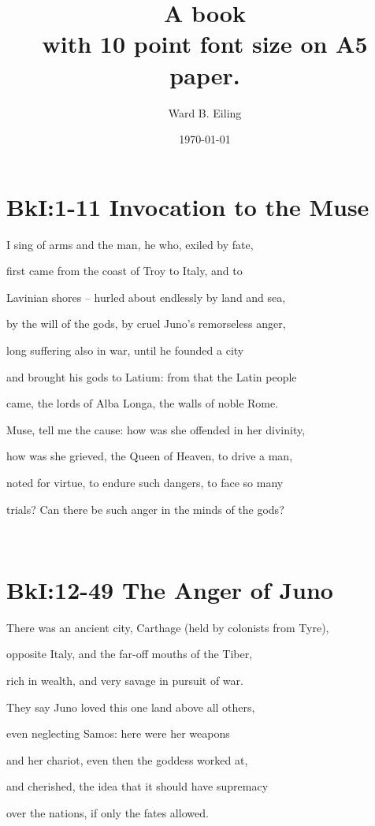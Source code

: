 \documentclass[10pt, a5paper, titlepage]{book}
\title{A book \\ \small with 10 point font size on A5 paper.}
\author{Ward B. Eiling}
\date{\today}
\begin{document}
\maketitle
\newpage

\section*{BkI:1-11 Invocation to the Muse}

I sing of arms and the man, he who, exiled by fate,

first came from the coast of Troy to Italy, and to

Lavinian shores – hurled about endlessly by land and sea,

by the will of the gods, by cruel Juno’s remorseless anger,

long suffering also in war, until he founded a city

and brought his gods to Latium: from that the Latin people

came, the lords of Alba Longa, the walls of noble Rome.

Muse, tell me the cause: how was she offended in her divinity,

how was she grieved, the Queen of Heaven, to drive a man,

noted for virtue, to endure such dangers, to face so many

trials? Can there be such anger in the minds of the gods?


\\


\section*{BkI:12-49 The Anger of Juno}

There was an ancient city, Carthage (held by colonists from Tyre),

opposite Italy, and the far-off mouths of the Tiber,

rich in wealth, and very savage in pursuit of war.

They say Juno loved this one land above all others,

even neglecting Samos: here were her weapons

and her chariot, even then the goddess worked at,

and cherished, the idea that it should have supremacy

over the nations, if only the fates allowed.
\end{document}
